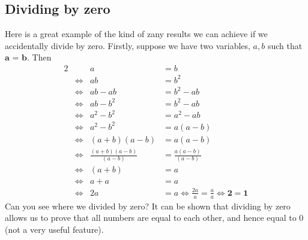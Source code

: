 \subsection*{Dividing by zero}
Here is a great example of the kind of zany results we can achieve if we accidentally divide by zero. Firstly, suppose we have two variables, $a,b$ such that $\textbf{a = b}.$ Then
\begin{alignat*}{2}
&& a 
& = b \\
&\iff
&ab 
& = b^2 \tag{multiplying both sides by $b$} \\
&\iff
&ab - ab 
& = b^2 - ab \tag{subtracting $ab$ from both sides} \\
&\iff
& ab - b^2 
& = b^2 - ab \tag{since $a = b$ we just replaced one instance of $a$ with $b$} \\
& \iff
& a^2 - b^2
& = a^2 - ab \tag{we just replaced two instances of $b$ with $a$} \\
& \iff
&a^2 - b^2
& = a(a-b) \tag{we factored out $a$ from the terms on the left hand side} \\
&\iff
&(a+b)(a-b)
& = a(a-b) \tag{you can check that $(a+b)(a-b) = a^2 - b^2$ by expanding} \\
& \iff 
& \frac{(a+b)(a-b)}{(a-b)}
& = \frac{a(a-b)}{(a-b)} \tag{dividing both sides by $(a-b)$} \\
& \iff
& (a+b)
& = a \tag{algebra of fractions} \\
& \iff
& a+a 
& = a \tag{since $b = a$} \\
& \iff
& 2a 
& = a \iff \frac{2a}{a} = \frac{a}{a} \iff \mathbf{2 = 1}
\end{alignat*}
Can you see where we divided by zero? It can be shown that dividing by zero allows us to prove that all numbers are equal to each other, and hence equal to 0 (not a very useful feature).

